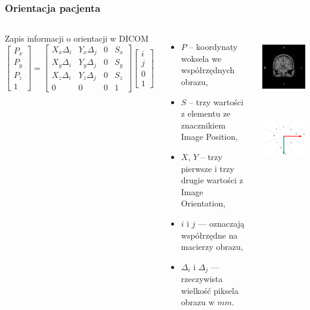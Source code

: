 \documentclass[aspectratio=169]{beamer}
\begin{document}
\begin{frame}[t]
    \frametitle{Orientacja pacjenta}
    \begin{columns}[t]

        Zapis informacji o orientacji w DICOM
        \tiny
        \[
            \begin{bmatrix}
                P_x \\ P_y \\ P_z \\ 1
            \end{bmatrix}
            =
            \begin{bmatrix}
                X_x\Delta_i & Y_x\Delta_j & 0 & S_x \\
                X_y\Delta_i & Y_y\Delta_j & 0 & S_y \\
                X_z\Delta_i & Y_z\Delta_j & 0 & S_z \\
                0           & 0           & 0 & 1
            \end{bmatrix}
            \begin{bmatrix}
                i \\ j \\ 0 \\ 1
            \end{bmatrix}
        \]
        \vspace{-1em}
        \begin{itemize}
            \item $P$ -- koordynaty woksela we współrzędnych obrazu,
            \item $S$ -- trzy wartości z elementu ze znacznikiem Image Position,
            \item $X$, $Y$ -- trzy pierwsze i trzy drugie wartości z Image Orientation,
            \item $i$ i $j$ --- oznaczają współrzędne na macierzy obrazu,
            \item $\Delta_i$ i $\Delta_j$ --- rzeczywista wielkość piksela obrazu w $mm$.
        \end{itemize}

        \includegraphics[height=3cm]{img/imageorientationindicator-005.png}
        \includegraphics[height=3cm]{img/imageorientationindicator-004.pdf}


\end{columns}
\end{frame}
\end{document}
